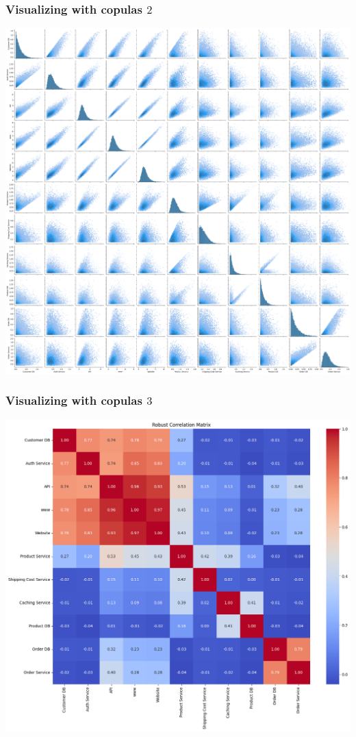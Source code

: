 \documentclass[18pt,aspectratio=149]{beamer}
\begin{document}
\begin{frame}
    \frametitle{Visualizing with copulas $2$}
    \begin{center}
        \includegraphics[height=0.8\textheight]{pairplotraw.png}
    \end{center}
\end{frame}

\begin{frame}
    \frametitle{Visualizing with copulas $3$}
    \begin{center}
        \includegraphics[height=0.8\textheight]{robust_correlation.png}
    \end{center}
\end{frame}
\end{document}
